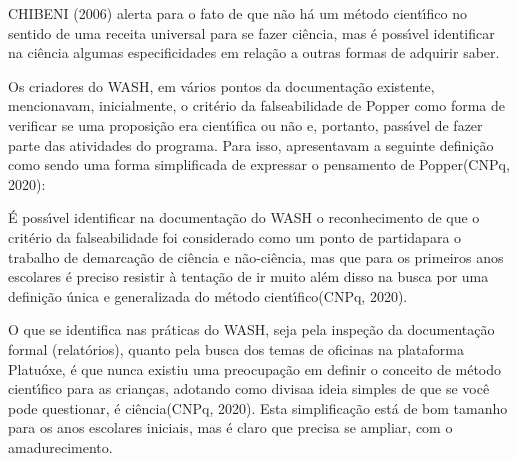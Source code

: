 \documentclass[
12pt,		%
openright,	%
twoside,  %
a4paper,			%
chapter=TITLE,		%
english,			%
french,				%
spanish,			%
brazil				%
]{USPSC-classe/USPSC}
\begin{document}
 CHIBENI (2006) alerta para o fato de que \textquotedbl n\~ao h\'a um m\'etodo cient\'{\i}fico no sentido de uma receita universal para se fazer ci\^encia\textquotedbl , mas \'e poss\'{\i}vel identificar na ci\^encia algumas especificidades em rela\c{c}\~ao a outras formas de adquirir saber.








Os criadores do WASH, em v\'arios pontos da documenta\c{c}\~ao existente, mencionavam, inicialmente, o crit\'erio da falseabilidade de Popper como forma de verificar se uma proposi\c{c}\~ao era cient\'{\i}fica ou n\~ao e, portanto, pass\'{\i}vel de fazer parte das atividades do programa. Para isso, apresentavam a seguinte defini\c{c}\~ao como sendo uma \textquotedbl forma simplificada de expressar o pensamento de Popper\textquotedbl   (CNPq, 2020):









\noindent\begin{center}\mbox{\centering{}}\end{center}


\'E poss\'{\i}vel identificar na documenta\c{c}\~ao do WASH o reconhecimento de que o crit\'erio da falseabilidade foi considerado como um \textquotedbl ponto de partida\textquotedbl  para o trabalho de \textquotedbl demarca\c{c}\~ao de ci\^encia e n\~ao-ci\^encia\textquotedbl , mas que para \textquotedbl os primeiros anos escolares \'e preciso resistir \`a tenta\c{c}\~ao de ir muito al\'em disso na busca por uma defini\c{c}\~ao \'unica e generalizada do m\'etodo cient\'{\i}fico\textquotedbl   (CNPq, 2020).








O que se identifica nas pr\'aticas do WASH, seja pela inspe\c{c}\~ao da documenta\c{c}\~ao formal (relat\'orios), quanto pela busca dos temas de oficinas na plataforma \textquotedbl Platu\'oxe\textquotedbl , \'e que nunca existiu uma preocupa\c{c}\~ao em definir o conceito de m\'etodo cient\'{\i}fico para as crian\c{c}as, adotando como \textquotedbl divisa\textquotedbl  a ideia simples de que \textquotedbl se voc\^e pode questionar, \'e ci\^encia\textquotedbl   (CNPq, 2020). Esta simplifica\c{c}\~ao est\'a de bom tamanho para os anos escolares iniciais, mas \'e claro que precisa se ampliar, com o amadurecimento.
\end{document}
